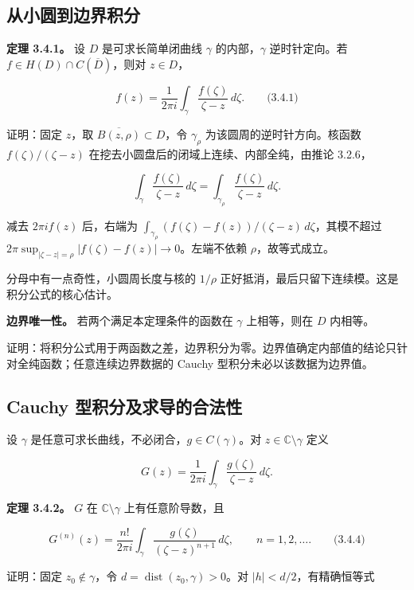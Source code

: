 \documentclass[11pt,a4paper]{article}
\begin{document}
\subsection{从小圆到边界积分}\label{ch03-s4-ux4eceux5c0fux5706ux5230ux8fb9ux754cux79efux5206}

\textbf{定理 3.4.1。} 设 \(D\) 是可求长简单闭曲线 \(\gamma\)
的内部，\(\gamma\) 逆时针定向。若 \(f\in H(D)\cap C(\overline D)\)，则对
\(z\in D\)，

\[
f(z)=\frac1{2\pi i}\int_\gamma\frac{f(\zeta)}{\zeta-z}\,d\zeta.
\qquad\text{(3.4.1)}
\]

证明：固定 \(z\)，取 \(\overline{B(z,\rho)}\subset D\)，令
\(\gamma_\rho\) 为该圆周的逆时针方向。核函数 \(f(\zeta)/(\zeta-z)\)
在挖去小圆盘后的闭域上连续、内部全纯，由推论 3.2.6，

\[
\int_\gamma\frac{f(\zeta)}{\zeta-z}\,d\zeta
=\int_{\gamma_\rho}\frac{f(\zeta)}{\zeta-z}\,d\zeta.
\]

减去 \(2\pi i f(z)\) 后，右端为
\(\int_{\gamma_\rho}(f(\zeta)-f(z))/(\zeta-z)\,d\zeta\)，其模不超过
\(2\pi\sup_{|\zeta-z|=\rho}|f(\zeta)-f(z)|\to0\)。左端不依赖
\(\rho\)，故等式成立。

分母中有一点奇性，小圆周长度与核的 \(1/\rho\)
正好抵消，最后只留下连续模。这是积分公式的核心估计。

\textbf{边界唯一性。} 若两个满足本定理条件的函数在 \(\gamma\)
上相等，则在 \(D\) 内相等。

证明：将积分公式用于两函数之差，边界积分为零。边界值确定内部值的结论只针对全纯函数；任意连续边界数据的
Cauchy 型积分未必以该数据为边界值。

\subsection{Cauchy
型积分及求导的合法性}\label{ch03-s4-cauchy-ux578bux79efux5206ux53caux6c42ux5bfcux7684ux5408ux6cd5ux6027}

设 \(\gamma\) 是任意可求长曲线，不必闭合，\(g\in C(\gamma)\)。对
\(z\in\mathbb C\setminus\gamma\) 定义

\[
G(z)=\frac1{2\pi i}\int_\gamma\frac{g(\zeta)}{\zeta-z}\,d\zeta.
\]

\textbf{定理 3.4.2。} \(G\) 在 \(\mathbb C\setminus\gamma\)
上有任意阶导数，且

\[
G^{(n)}(z)=\frac{n!}{2\pi i}\int_\gamma
\frac{g(\zeta)}{(\zeta-z)^{n+1}}\,d\zeta,
\qquad n=1,2,\ldots.
\qquad\text{(3.4.4)}
\]

证明：固定 \(z_0\notin\gamma\)，令
\(d=\operatorname{dist}(z_0,\gamma)>0\)。对 \(|h|<d/2\)，有精确恒等式
\end{document}
